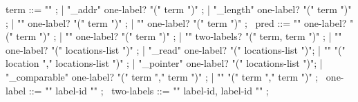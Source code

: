 \begin{syntax}
  term ::= "\null" ;
        | "\base_addr" one-label? "(" term ")" ;
        | "\block_length" one-label? "(" term ")" ;
        | "\offset" one-label?  "(" term ")" ;
        | {"\allocation"} one-label? "(" term ")" ;
       \
  pred ::=  "\allocable" one-label? "(" term ")" ;
       |  "\freeable" one-label? "(" term ")" ;
       | "\fresh"   two-labels? "(" term, term ")" ;
       | "\valid"  one-label?  "(" locations-list ")" ;
       | "\valid_read"  one-label? "(" locations-list ")";
       | "\separated" "(" location "," locations-list ")" ;
       | "\object_pointer" one-label? "(" locations-list ")";
       | "\pointer_comparable" one-label? "(" term "," term ")" ;
       | "\aligned" "(" term "," term ")" ;
       \
  one-label ::= "{" label-id "}" ;
       \
  two-labels ::= "{" label-id, label-id "}" ;
\end{syntax}

